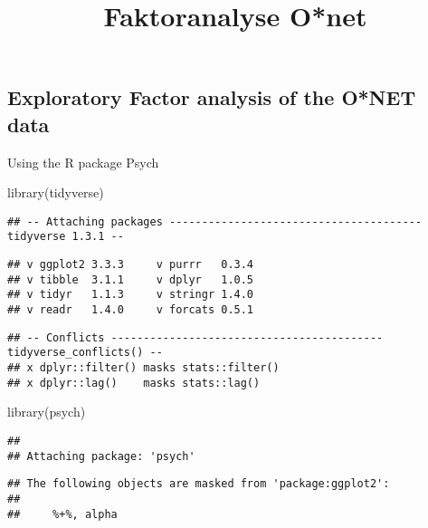 \documentclass[
]{article}
\title{Faktoranalyse O*net}
\author{}
\date{\vspace{-2.5em}}
\newenvironment{Shaded}{\begin{snugshade}}{\end{snugshade}}
\newcommand{\FunctionTok}[1]{\textcolor[rgb]{0.00,0.00,0.00}{#1}}
\newcommand{\NormalTok}[1]{#1}
\begin{document}
\maketitle

\hypertarget{exploratory-factor-analysis-of-the-onet-data}{%
\subsection{Exploratory Factor analysis of the O*NET
data}\label{exploratory-factor-analysis-of-the-onet-data}}

Using the R package Psych

\begin{Shaded}
\begin{Highlighting}[]
\FunctionTok{library}\NormalTok{(tidyverse)}
\end{Highlighting}
\end{Shaded}

\begin{verbatim}
## -- Attaching packages --------------------------------------- tidyverse 1.3.1 --
\end{verbatim}

\begin{verbatim}
## v ggplot2 3.3.3     v purrr   0.3.4
## v tibble  3.1.1     v dplyr   1.0.5
## v tidyr   1.1.3     v stringr 1.4.0
## v readr   1.4.0     v forcats 0.5.1
\end{verbatim}

\begin{verbatim}
## -- Conflicts ------------------------------------------ tidyverse_conflicts() --
## x dplyr::filter() masks stats::filter()
## x dplyr::lag()    masks stats::lag()
\end{verbatim}

\begin{Shaded}
\begin{Highlighting}[]
\FunctionTok{library}\NormalTok{(psych)}
\end{Highlighting}
\end{Shaded}

\begin{verbatim}
## 
## Attaching package: 'psych'
\end{verbatim}

\begin{verbatim}
## The following objects are masked from 'package:ggplot2':
## 
##     %+%, alpha
\end{verbatim}
\end{document}
